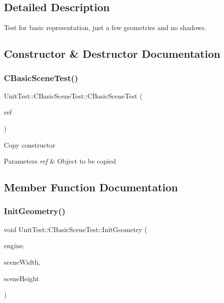 \subsection{Detailed Description}
Test for basic representation, just a few geometries and no shadows. 

\subsection{Constructor \& Destructor Documentation}
\mbox{\label{class_unit_test_1_1_c_basic_scene_test_a95b3e53cda711c09c0abc6a286e55af2}} 
\subsubsection{\texorpdfstring{CBasicSceneTest()}{CBasicSceneTest()}}
{\footnotesize\ttfamily Unit\+Test\+::\+C\+Basic\+Scene\+Test\+::\+C\+Basic\+Scene\+Test (\begin{DoxyParamCaption}\item[{const \mbox{\hyperlink{class_unit_test_1_1_c_basic_scene_test}{C\+Basic\+Scene\+Test}} \&}]{ref }\end{DoxyParamCaption})\hspace{0.3cm}{\ttfamily [inline]}}

Copy constructor 
\begin{DoxyParams}{Parameters}
{\em ref} & Object to be copied \\
\hline
\end{DoxyParams}


\subsection{Member Function Documentation}
\mbox{\label{class_unit_test_1_1_c_basic_scene_test_a8e16c345a72dc092c15e7f848ea69867}} 
\subsubsection{\texorpdfstring{InitGeometry()}{InitGeometry()}}
{\footnotesize\ttfamily void Unit\+Test\+::\+C\+Basic\+Scene\+Test\+::\+Init\+Geometry (\begin{DoxyParamCaption}\item[{\mbox{\hyperlink{class_geometry_engine_1_1_geometry_engine}{Geometry\+Engine\+::\+Geometry\+Engine}} $\ast$}]{engine,  }\item[{int}]{scene\+Width,  }\item[{int}]{scene\+Height }\end{DoxyParamCaption})\hspace{0.3cm}{\ttfamily [virtual]}}

